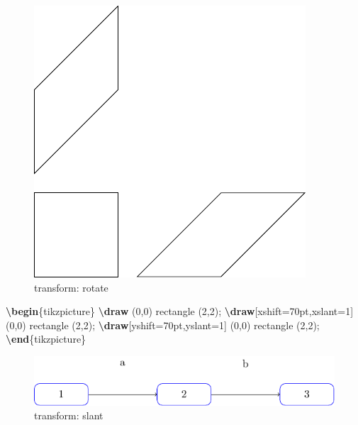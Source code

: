 \documentclass[
]{book}
\newenvironment{Shaded}{\begin{snugshade}}{\end{snugshade}}
\newcommand{\ExtensionTok}[1]{#1}
\newcommand{\FunctionTok}[1]{\textcolor[rgb]{0.13,0.29,0.53}{\textbf{#1}}}
\newcommand{\KeywordTok}[1]{\textcolor[rgb]{0.13,0.29,0.53}{\textbf{#1}}}
\newcommand{\NormalTok}[1]{#1}
\theoremstyle{definition}
\theoremstyle{definition}
\theoremstyle{definition}
\theoremstyle{definition}
\theoremstyle{remark}
\begin{document}
\begin{figure}
\includegraphics[width=0.75\linewidth]{202401311000-TikZ_files/figure-latex/unnamed-chunk-53-1} \caption{transform: rotate}\label{fig:unnamed-chunk-53}
\end{figure}

\begin{Shaded}
\begin{Highlighting}[]
\KeywordTok{\textbackslash{}begin}\NormalTok{\{}\ExtensionTok{tikzpicture}\NormalTok{\}}
  \FunctionTok{\textbackslash{}draw}\NormalTok{ (0,0) rectangle (2,2);}
  \FunctionTok{\textbackslash{}draw}\NormalTok{[xshift=70pt,xslant=1] (0,0) rectangle (2,2);}
  \FunctionTok{\textbackslash{}draw}\NormalTok{[yshift=70pt,yslant=1] (0,0) rectangle (2,2);}
\KeywordTok{\textbackslash{}end}\NormalTok{\{}\ExtensionTok{tikzpicture}\NormalTok{\}}
\end{Highlighting}
\end{Shaded}

\begin{figure}
\includegraphics[width=0.75\linewidth]{202401311000-TikZ_files/figure-latex/unnamed-chunk-55-1} \caption{transform: slant}\label{fig:unnamed-chunk-55}
\end{figure}
\end{document}
